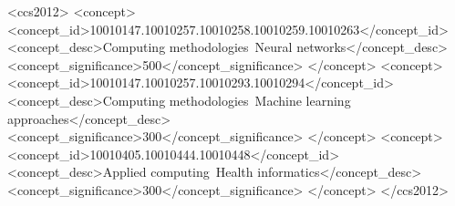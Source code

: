 \documentclass[acmsmall,screen,review]{acmart}
\begin{document}
\begin{CCSXML}
<ccs2012>
   <concept>
       <concept_id>10010147.10010257.10010258.10010259.10010263</concept_id>
       <concept_desc>Computing methodologies~Neural networks</concept_desc>
       <concept_significance>500</concept_significance>
   </concept>
   <concept>
       <concept_id>10010147.10010257.10010293.10010294</concept_id>
       <concept_desc>Computing methodologies~Machine learning approaches</concept_desc>
       <concept_significance>300</concept_significance>
   </concept>
   <concept>
       <concept_id>10010405.10010444.10010448</concept_id>
       <concept_desc>Applied computing~Health informatics</concept_desc>
       <concept_significance>300</concept_significance>
   </concept>
</ccs2012>
\end{CCSXML}




\maketitle







\end{document}
